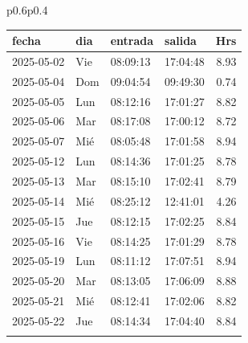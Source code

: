 \documentclass[11pt,a4paper]{article}
\newcommand{\mejoradatabla}[1]{
  \renewcommand{\arraystretch}{1.3}
  \setlength{\tabcolsep}{10pt}
#1
  \renewcommand{\arraystretch}{1}
  \setlength{\tabcolsep}{6pt}
}
\begin{document}
\begin{tabular}{p{}p{}}
\mejoradatabla{
\begin{tabular}{p{2cm} p{0.6cm} p{1.2cm} p{1.2cm} r}
\toprule
\rowcolor{grisclaro} \textbf{fecha} & \textbf{dia} & \textbf{entrada} & \textbf{salida} & \textbf{Hrs}\\
\midrule

\rowcolor{white}%
2025-05-02 & Vie & 08:09:13 & 17:04:48 &8.93\\
\rowcolor{white}%
\rowcolor{corporativo!20}
 2025-05-04  &  Dom  &  09:04:54  &  09:49:30  &%
         0.74\\
\rowcolor{white}%
2025-05-05 & Lun & 08:12:16 & 17:01:27 &8.82\\
\rowcolor{white}%
2025-05-06 & Mar & 08:17:08 & 17:00:12 &8.72\\
\rowcolor{white}%
2025-05-07 & Mié & 08:05:48 & 17:01:58 &8.94\\
\rowcolor{white}%
2025-05-12 & Lun & 08:14:36 & 17:01:25 &8.78\\
\rowcolor{white}%
2025-05-13 & Mar & 08:15:10 & 17:02:41 &8.79\\
\rowcolor{white}%
2025-05-14 & Mié & 08:25:12 & 12:41:01 &4.26\\
\rowcolor{white}%
2025-05-15 & Jue & 08:12:15 & 17:02:25 &8.84\\
\rowcolor{white}%
2025-05-16 & Vie & 08:14:25 & 17:01:29 &8.78\\
\rowcolor{white}%
2025-05-19 & Lun & 08:11:12 & 17:07:51 &8.94\\
\rowcolor{white}%
2025-05-20 & Mar & 08:13:05 & 17:06:09 &8.88\\
\rowcolor{white}%
2025-05-21 & Mié & 08:12:41 & 17:02:06 &8.82\\
\rowcolor{white}%
2025-05-22 & Jue & 08:14:34 & 17:04:40 &8.84\\
\rowcolor{white}%

\end{tabular}}
\end{tabular}
\end{document}
